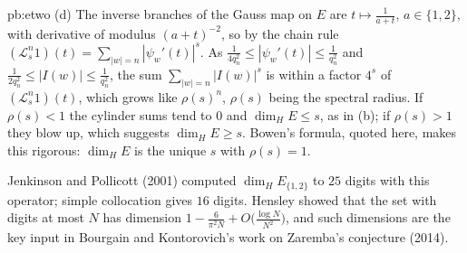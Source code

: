 \begin{solution}{pb:etwo}
(d) The inverse branches of the Gauss map on $E$ are $t\mapsto\frac1{a+t}$, $a\in\{1,2\}$, with derivative of modulus $(a+t)^{-2}$, so by the chain rule
$(\mathcal L_s^n1)(t)=\sum_{|w|=n}|\psi_w'(t)|^s$. As $\frac1{4q_n^2}\le|\psi_w'(t)|\le\frac1{q_n^2}$ and $\frac1{2q_n^2}\le|I(w)|\le\frac1{q_n^2}$, the sum
$\sum_{|w|=n}|I(w)|^s$ is within a factor $4^s$ of $(\mathcal L_s^n1)(t)$, which grows like $\rho(s)^n$, $\rho(s)$ being the spectral radius. If $\rho(s)<1$ the cylinder sums
tend to $0$ and $\dim_HE\le s$, as in (b); if $\rho(s)>1$ they blow up, which suggests $\dim_HE\ge s$. Bowen's formula, quoted here, makes this rigorous: $\dim_HE$ is
the unique $s$ with $\rho(s)=1$.

\leads Jenkinson and Pollicott (2001) computed $\dim_HE_{\{1,2\}}$ to $25$ digits with this operator; simple collocation gives $16$ digits. Hensley showed that the
set with digits at most $N$ has dimension $1-\frac6{\pi^2N}+O\bigl(\frac{\log N}{N^2}\bigr)$, and such dimensions are the key input in Bourgain and Kontorovich's work
on Zaremba's conjecture (2014).
\end{solution}

